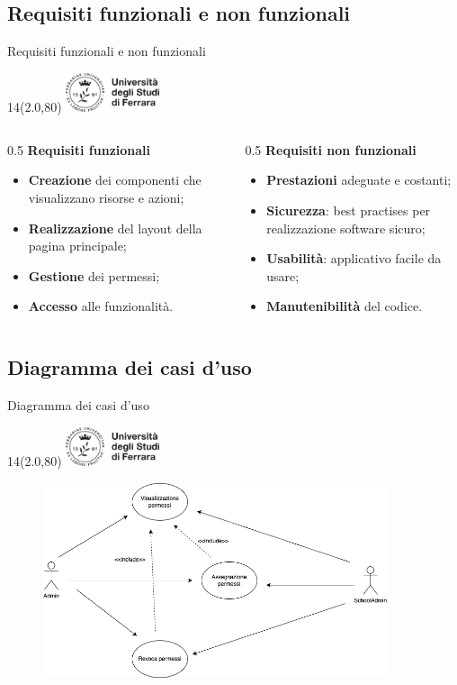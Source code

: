 \documentclass[11pt,xcolor={dvipsnames}]{beamer} %
\newcommand{\MyLogo}{%
\begin{textblock}{14}(2.0,80)
 \includegraphics[height=1.15cm, angle=0]{logo}
\end{textblock}
}
\begin{document}
\subsection{Requisiti funzionali e non funzionali}
\begin{frame}{Requisiti funzionali e non funzionali}
	\transboxin
	\MyLogo
	\begin{columns}[T] %
		\begin{column}{0.5\textwidth}
			\textbf{Requisiti funzionali}
			\begin{itemize}
				\item \textbf{Creazione} dei componenti che visualizzano risorse e azioni;
				\item \textbf{Realizzazione} del layout della pagina principale;
				\item \textbf{Gestione} dei permessi;
				\item \textbf{Accesso} alle funzionalità.
			\end{itemize}
		\end{column}
		\begin{column}{0.5\textwidth}
			\textbf{Requisiti non funzionali}
			\begin{itemize}
				\item \textbf{Prestazioni} adeguate e costanti;
				\item \textbf{Sicurezza}: best practises per realizzazione software sicuro;
				\item \textbf{Usabilità}: applicativo facile da usare;
				\item \textbf{Manutenibilità} del codice.
			\end{itemize}
		\end{column}
	\end{columns}
\end{frame}

\subsection{Diagramma dei casi d'uso}

\begin{frame}{Diagramma dei casi d'uso}
	\MyLogo
	\begin{figure}[H]
		\centering
		\includegraphics[width=0.9\textwidth]{../images/diagramma-casi-uso-attori.png}
	\end{figure}
\end{frame}
\end{document}
